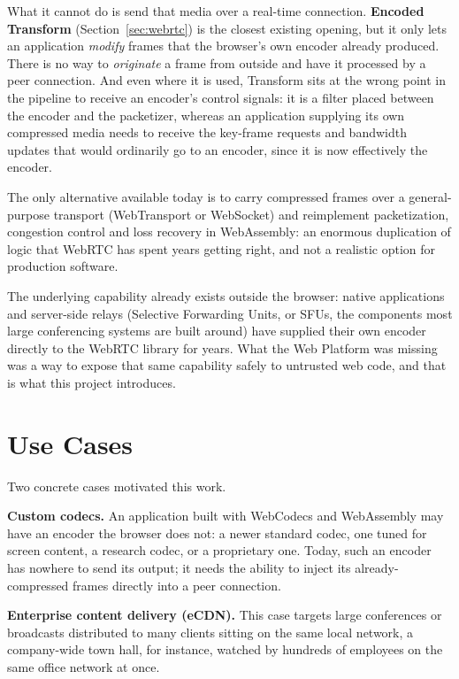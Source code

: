 \documentclass[11pt]{article}
\begin{document}
What it cannot do is send that media over a real-time connection. \textbf{Encoded Transform} (Section~\ref{sec:webrtc}) is the closest existing opening, but it only lets an application \emph{modify} frames that the browser's own encoder already produced. There is no way to \emph{originate} a frame from outside and have it processed by a peer connection. And even where it is used, Transform sits at the wrong point in the pipeline to receive an encoder's control signals: it is a filter placed between the encoder and the packetizer, whereas an application supplying its own compressed media needs to receive the key-frame requests and bandwidth updates that would ordinarily go to an encoder, since it is now effectively the encoder.

The only alternative available today is to carry compressed frames over a general-purpose transport (WebTransport or WebSocket) and reimplement packetization, congestion control and loss recovery in WebAssembly: an enormous duplication of logic that WebRTC has spent years getting right, and not a realistic option for production software.

The underlying capability already exists outside the browser: native applications and server-side relays (Selective Forwarding Units, or SFUs, the components most large conferencing systems are built around) have supplied their own encoder directly to the WebRTC library for years. What the Web Platform was missing was a way to expose that same capability safely to untrusted web code, and that is what this project introduces.

\section{Use Cases}
\label{sec:usecases}

Two concrete cases motivated this work.

\textbf{Custom codecs.} An application built with WebCodecs and WebAssembly may have an encoder the browser does not: a newer standard codec, one tuned for screen content, a research codec, or a proprietary one. Today, such an encoder has nowhere to send its output; it needs the ability to inject its already-compressed frames directly into a peer connection.

\textbf{Enterprise content delivery (eCDN).} This case targets large conferences or broadcasts distributed to many clients sitting on the same local network, a company-wide town hall, for instance, watched by hundreds of employees on the same office network at once.
\end{document}
